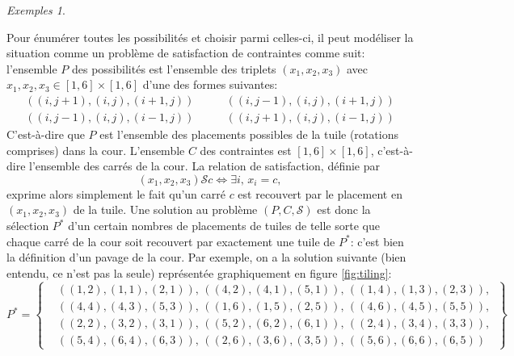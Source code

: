 \documentclass[french,a4paper]{article}
\theoremstyle{definition}
\theoremstyle{remark}
\newtheorem*{examples}{Exemples}
\begin{document}
\begin{examples}
\begin{enumerate}[label=(\arabic*)]
    Pour énumérer toutes les possibilités et choisir parmi celles-ci,
    il peut modéliser la situation comme un problème de satisfaction
    de contraintes comme suit: l'ensemble $P$ des possibilités est
    l'ensemble des triplets $(x_1,x_2,x_3)$ avec
    $x_1,x_2,x_3 \in [1,6]\times[1,6]$ d'une des formes suivantes:
    \begin{displaymath}
      \begin{aligned}
        ((i,j+1),(i,j),(i+1,j)) &\qquad
        ((i,j-1),(i,j),(i+1,j))\\
        ((i,j-1),(i,j),(i-1,j)) &\qquad
        ((i,j+1),(i,j),(i-1,j))
      \end{aligned}
    \end{displaymath}
    C'est-à-dire que $P$ est l'ensemble des placements possibles de la
    tuile (rotations comprises) dans la cour. L'ensemble $C$ des
    contraintes est $[1,6] \times [1,6]$, c'est-à-dire l'ensemble des
    carrés de la cour. La relation de satisfaction, définie par
    \begin{displaymath}
      (x_1,x_2,x_3) \mathrel{\mathcal S} c \iff \exists i,\, x_i = c,
    \end{displaymath}
    exprime alors simplement le fait qu'un carré $c$ est recouvert par
    le placement en $(x_1,x_2,x_3)$ de la tuile. Une solution au
    problème $(P,C,\mathcal S)$ est donc la sélection $P^\ast$ d'un
    certain nombres de placements de tuiles de telle sorte que chaque
    carré de la cour soit recouvert par exactement une tuile de
    $P^\ast$: c'est bien la définition d'un pavage de la cour. Par
    exemple, on a la solution suivante (bien entendu, ce n'est pas la
    seule) représentée graphiquement en figure \ref{fig:tiling}:
    \begin{displaymath}
      P^\ast = \left\{
        \begin{aligned}
          &((1,2),(1,1),(2,1)),\,
          ((4,2),(4,1),(5,1)),\,
          ((1,4),(1,3),(2,3)),\\
          &((4,4),(4,3),(5,3)),\,
          ((1,6),(1,5),(2,5)),\,
          ((4,6),(4,5),(5,5)),\,\\
          &((2,2),(3,2),(3,1)),\,
          ((5,2),(6,2),(6,1)),\,
          ((2,4),(3,4),(3,3)),\\
          &((5,4),(6,4),(6,3)),\,
          ((2,6),(3,6),(3,5)),\,
          ((5,6),(6,6),(6,5))
        \end{aligned}
      \right\}
    \end{displaymath}
    \begin{figure}[h!]

\end{figure}
\end{enumerate}
\end{examples}
\end{document}

